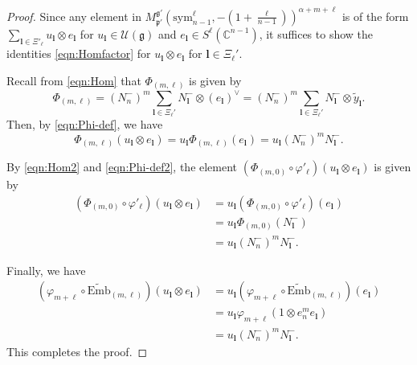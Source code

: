 \documentclass[reqno,11pt]{amsart}
\theoremstyle{remark}
\theoremstyle{definition}
\numberwithin{equation}{section}
\newcommand{\ga}{\alpha}
\newcommand{\fg}{{\mathfrak g}}
\newcommand{\fp}{{\mathfrak p}}
\newcommand{\C}{\mathbb{C}}
\newcommand{\Cal}{\mathcal}
\newcommand{\sym}{\mathrm{sym}}
\newcommand{\Mpp}{M^{\fg'}_{\fp'}}
\newcommand{\wEmb}{\widetilde{\mathrm{Emb}}}
\begin{document}
\begin{proof}
Since any element in 
$\Mpp(\sym^\ell_{n-1},-(1+\tfrac{\ell}{n-1}))^{\ga+m+\ell}$ is of the form 
$\sum_{\mathbf{l} \in \Xi'_{\ell}}u_{\mathbf{l}} \otimes e_{\mathbf{l}}$
for $u_{\mathbf{l}} \in \Cal{U}(\fg)$ and $e_{\mathbf{l}} \in S^\ell(\C^{n-1})$,
it suffices to show the identities \eqref{eqn:Homfactor} for 
$u_{\mathbf{l}} \otimes e_{\mathbf{l}}$ for $\mathbf{l} \in \Xi_\ell'$. 

Recall from \eqref{eqn:Hom} that $\Phi_{(m,\ell)}$ is given by
\begin{equation*}
\Phi_{(m,\ell)}
= 
(N_n^-)^m
\sum_{\mathbf{l} \in \Xi_\ell'} 
N_{\mathbf{l}}^-
\otimes 
(e_{\mathbf{l}})^\vee
= 
(N_n^-)^m
\sum_{\mathbf{l} \in \Xi_\ell'} 
N_{\mathbf{l}}^-
\otimes 
\widetilde{y}_{\mathbf{l}}.
\end{equation*}
Then, by \eqref{eqn:Phi-def}, we have 
\begin{equation*}
\Phi_{(m,\ell)} (u_{\mathbf{l}} \otimes e_{\mathbf{l}})
=u_{\mathbf{l}} \Phi_{(m,\ell)}(e_{\mathbf{l}})
=u_{\mathbf{l}} (N^-_n)^m N^-_{\mathbf{l}}.
\end{equation*}

By \eqref{eqn:Hom2} and \eqref{eqn:Phi-def2},
the element 
$(\Phi_{(m,0)} \circ \varphi'_{\ell})(u_{\mathbf{l}} \otimes e_{\mathbf{l}})$ is given by
\begin{align*}
(\Phi_{(m,0)} \circ \varphi'_{\ell})(u_{\mathbf{l}} \otimes e_{\mathbf{l}})
&=u_{\mathbf{l}} (\Phi_{(m,0)} \circ \varphi'_{\ell})(e_{\mathbf{l}})\\
&=u_{\mathbf{l}} \Phi_{(m,0)}(N^-_{\mathbf{l}})\\
&=u_{\mathbf{l}} (N^-_n)^m N^-_{\mathbf{l}}.
\end{align*}

Finally, we have 
\begin{align*}
(\varphi_{m+\ell} \circ \wEmb_{(m,\ell)})(u_{\mathbf{l}} \otimes e_{\mathbf{l}})
&=u_{\mathbf{l}}(\varphi_{m+\ell} \circ \wEmb_{(m,\ell)})(e_{\mathbf{l}})\\
&=u_{\mathbf{l}}\varphi_{m+\ell}(1\otimes e^m_n e_{\mathbf{l}})\\
&=u_{\mathbf{l}} (N^-_n)^m N^-_{\mathbf{l}}.
\end{align*}
This completes the proof.
\end{proof}
\end{document}

